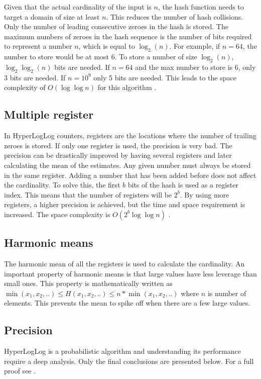 Given that the actual cardinality of the input is $n$, the hash function needs to target a domain of size at least $n$. This reduces the number of hash collisions. Only the number of leading consecutive zeroes in the hash is stored. The maximum numbers of zeroes in the hash sequence is the number of bits required to represent a number $n$, which is equal to $\log_2(n)$. For example, if $n=64$, the number to store would be at most 6. To store a number of size $\log_2(n)$, $\log_2\log_2(n)$ bits are needed. If $n=64$ and the max number to store is 6, only 3 bits are needed. If $n=10^9$ only 5 bits are needed. This leads to the space complexity of $O(\log\log n)$ for this algorithm \cite{hyperloglog}. 

\subsection{Multiple register}
In HyperLogLog counters, registers are the locations where the number of trailing zeroes is stored. If only one register is used, the precision is very bad. The precision can be drastically improved by having several registers and later calculating the mean of the estimates. Any given number must always be stored in the same register. Adding a number that has been added before does not affect the cardinality. To solve this, the first $b$ bits of the hash is used as a register index. This means that the number of registers will be $2^b$. By using more registers, a higher precision is achieved, but the time and space requirement is increased. The space complexity is $O(2^b\log\log n)$ \cite{hyperloglog}. 

\subsection{Harmonic means}
The harmonic mean of all the registers is used to calculate the cardinality. An important property of harmonic means is that large values have less leverage than small ones. This property is mathematically written as $\min(x_1,x_2,..) \leq H(x_1,x_2,..) \leq n*\min(x_1,x_2,..)$ where $n$ is number of elements. This prevents the mean to spike off when there are a few large values.  

\subsection{Precision}
HyperLogLog is a probabilistic algorithm and understanding its performance require a deep analysis. Only the final conclusions are presented below. For a full proof see \cite{hyperloglog}. 

